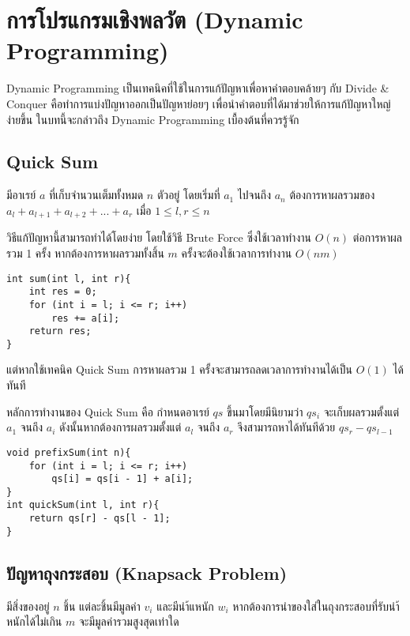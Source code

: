 \chapter{การโปรแกรมเชิงพลวัต (Dynamic Programming)}

Dynamic Programming เป็นเทคนิคที่ใช้ในการแก้ปัญหาเพื่อหาคำตอบคล้ายๆ กับ Divide \& Conquer คือทำการแบ่งปัญหาออกเป็นปัญหาย่อยๆ เพื่อนำคำตอบที่ได้มาช่วยให้การแก้ปัญหาใหญ่ง่ายขึ้น ในบทนี้จะกล่าวถึง Dynamic Programming เบื้องต้นที่ควรรู้จัก

\section{Quick Sum}

\begin{problem}
มีอาเรย์ $a$ ที่เก็บจำนวนเต็มทั้งหมด $n$ ตัวอยู่ โดยเริ่มที่ $a_1$ ไปจนถึง $a_n$ ต้องการหาผลรวมของ $a_l + a_{l+1} + a_{l+2} + ... + a_r$ เมื่อ $1\leq l,r \leq n$
\end{problem}

วิธีแก้ปัญหานี้สามารถทำได้โดยง่าย โดยใช้วิธี Brute Force ซึ่งใช้เวลาทำงาน $O(n)$ ต่อการหาผลรวม 1 ครั้ง หากต้องการหาผลรวมทั้งสิ้น $m$  ครั้งจะต้องใช้เวลาการทำงาน $O(nm)$

\begin{lstlisting}
int sum(int l, int r){
	int res = 0;
	for (int i = l; i <= r; i++)
		res += a[i];
	return res;
}
\end{lstlisting}

แต่หากใช้เทคนิค Quick Sum การหาผลรวม 1 ครั้งจะสามารถลดเวลาการทำงานได้เป็น $O(1)$ ได้ทันที

หลักการทำงานของ Quick Sum คือ กำหนดอาเรย์ $qs$ ขึ้นมาโดยมีนิยามว่า $qs_i$ จะเก็บผลรวมตั้งแต่ $a_1$ จนถึง $a_i$ ดังนั้นหากต้องการผลรวมตั้งแต่ $a_l$ จนถึง $a_r$  จึงสามารถหาได้ทันทีด้วย $qs_r - qs_{l-1}$

\begin{lstlisting}
void prefixSum(int n){
	for (int i = l; i <= r; i++)
		qs[i] = qs[i - 1] + a[i];
}
int quickSum(int l, int r){
	return qs[r] - qs[l - 1];
}
\end{lstlisting}

\section{ปัญหาถุงกระสอบ (Knapsack Problem)}

\begin{question}
มีสิ่งของอยู่ $n$ ชิ้น แต่ละชิ้นมีมูลค่า $v_i$ และมีนำ้แหนัก $w_i$ หากต้องการนำของใส่ในถุงกระสอบที่รับนำ้หนักได้ไม่เกิน $m$ จะมีมูลค่ารวมสูงสุดเท่าใด
\end{question}


